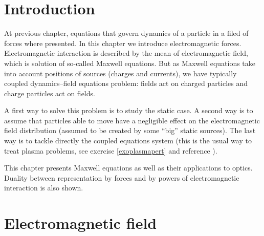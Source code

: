 \documentclass[12pt]{book}
\begin{document}
\section{Introduction}
At previous chapter, equations that govern dynamics of a particle in a
filed of forces where presented. In this chapter we introduce
electromagnetic forces.  
Electromagnetic interaction is described by the mean of electromagnetic
field, which is solution of so-called Maxwell equations. But as Maxwell
equations take into account positions of sources (charges and currents), we
have typically coupled dynamics--field equations problem: fields act on
charged particles and charge particles act on fields.

A first way to solve this problem is to study the static case. A second way is
to assume that particles able to move have a negligible effect on the
electromagnetic field distribution (assumed to be created by some ``big''
static sources). The last way is to tackle directly the coupled equations
system (this is the usual way to treat plasma problems, see exercise
\ref{exoplasmapert} and reference \cite{ph:plasm:Chen84}).

This chapter presents Maxwell equations as well as their applications to
optics. Duality between representation by forces and by powers of
electromagnetic interaction is also shown.
 
\section{Electromagnetic field}
\end{document}
